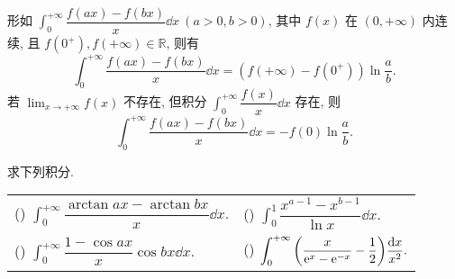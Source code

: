 \begin{theorem}
    形如 $\displaystyle\int_{0}^{+\infty}\dfrac{f(ax)-f(bx)}{x}\dd x~ (a>0,b>0)$, 其中 $f(x)$ 在 $(0,+\infty)$ 内连续, 且 $f(0^+),f(+\infty)\in\mathbb{R} $, 则有
    $$\int_{0}^{+\infty}\dfrac{f(ax)-f(bx)}{x}\dd x=(f(+\infty)-f(0^+))\ln\dfrac{a}{b}.$$
    若 $\displaystyle\lim_{x\to+\infty}f(x)$ 不存在, 但积分 $\displaystyle\int_{0}^{+\infty}\dfrac{f(x)}{x}\dd x$ 存在, 则
    $$\int_{0}^{+\infty}\dfrac{f(ax)-f(bx)}{x}\dd x=-f(0)\ln\dfrac{a}{b}.$$
\end{theorem}

\begin{example}
    求下列积分.
    \setcounter{magicrownumbers}{0}
    \begin{table}[H]
        \centering
        \begin{tabular}{l | l}
            (\rownumber{}) $\displaystyle\int_{0}^{+\infty}\dfrac{\arctan ax-\arctan bx}{x}\dd x.$ & (\rownumber{}) $\displaystyle\int_{0}^{1}\dfrac{x^{a-1}-x^{b-1}}{\ln x}\dd x.$                                  \\
            (\rownumber{}) $\displaystyle\int_{0}^{+\infty}\dfrac{1-\cos ax}{x}\cos bx\dd x.$      & (\rownumber{}) $\displaystyle\int_{0}^{+\infty}\qty(\dfrac{x}{\mathrm{e} ^x-\mathrm{e} ^{-x}}-\dfrac{1}{2})\dfrac{\dd x}{x^2}.$
        \end{tabular}
    \end{table}
\end{example}
